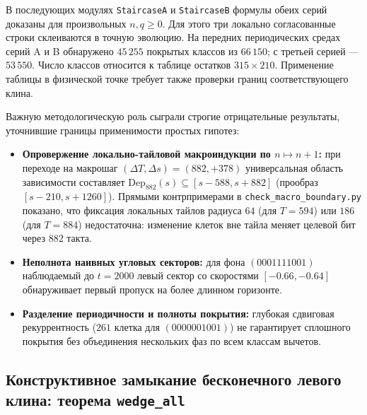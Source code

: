 В последующих модулях \texttt{StaircaseA} и \texttt{StaircaseB} формулы обеих серий доказаны для произвольных $n,q\ge0$. Для этого три локально согласованные строки склеиваются в точную эволюцию. На передних периодических средах серий A и B обнаружено $45\,255$ покрытых классов из $66\,150$; с третьей серией --- $53\,550$. Число классов относится к таблице остатков $315\times210$. Применение таблицы в физической точке требует также проверки границ соответствующего клина.

Важную методологическую роль сыграли строгие отрицательные результаты, уточнившие границы применимости простых гипотез:
\begin{itemize}
    \item \textbf{Опровержение локально-тайловой макроиндукции по $n \mapsto n+1$:} при переходе на макрошаг $(\Delta T, \Delta s) = (882, +378)$ универсальная область зависимости составляет $\mathrm{Dep}_{882}(s) \subseteq [s - 588, s + 882]$ (прообраз $[s - 210, s + 1260]$). Прямыми контрпримерами в \texttt{check\_macro\_boundary.py} показано, что фиксация локальных тайлов радиуса $64$ (для $T=594$) или $186$ (для $T=884$) недостаточна: изменение клеток вне тайла меняет целевой бит через $882$ такта.
    \item \textbf{Неполнота наивных угловых секторов:} для фона $(0001111001)$ наблюдаемый до $t = 2000$ левый сектор со скоростями $[-0.66, -0.64]$ обнаруживает первый пропуск на более длинном горизонте.
    \item \textbf{Разделение периодичности и полноты покрытия:} глубокая сдвиговая рекуррентность ($261$ клетка для $(0000001001)$) не гарантирует сплошного покрытия без объединения нескольких фаз по всем классам вычетов.
\end{itemize}

\subsection{Конструктивное замыкание бесконечного левого клина: теорема \texttt{wedge\_all}}

